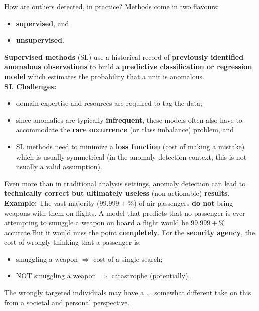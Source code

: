 \documentclass[20pt,landscape,footrule,headrule]{foils}
\newcommand{\newl}{\newline\newline}
\def\fh{\foilhead}
\begin{document}
\fh{Learning Framework} 
\noindent How are outliers detected, in practice? 
\newl Methods come in two flavours: 
\begin{itemize}
\item \textbf{supervised}, and 
\item \textbf{unsupervised}.\end{itemize}
\textbf{Supervised methods} (SL) use a historical record of \textbf{previously identified anomalous observations} to build a \textbf{predictive classification or regression model} which estimates the probability that a unit is anomalous.
\newpage\ \\ \noindent  \textbf{SL Challenges:} 
\begin{itemize}
\item domain expertise and resources are required to tag the data;
\item since anomalies are typically \textbf{infrequent}, these models often also have to accommodate the \textbf{rare occurrence} (or class imbalance) problem, and 
\item SL methods need to minimize a \textbf{loss function} (cost of making a mistake) which is usually symmetrical (in the anomaly detection context, this  is not usually a valid assumption). 
\end{itemize}
Even more than in traditional analysis settings, anomaly detection can lead to \textbf{technically correct but ultimately useless} (non-actionable) \textbf{results}. 
\newpage\ \\ \noindent  \textbf{Example:} The vast majority ($99.999+$\%) of air passengers \textbf{do not} bring weapons with them on flights. \newl A model that predicts that no passenger is ever attempting to smuggle a weapon on board a flight would be $99.999+$\% accurate.\newl But it would miss the point \textbf{completely}. For the \textbf{security agency}, the cost of wrongly thinking that a passenger is:
\begin{itemize}
\item  smuggling a weapon $\Longrightarrow$ cost of a single search;
\item NOT smuggling a weapon $\Longrightarrow$ catastrophe (potentially). 
\end{itemize}
\noindent The wrongly targeted individuals may have a  ... somewhat different take on this, from a societal and personal perspective.
\end{document}
